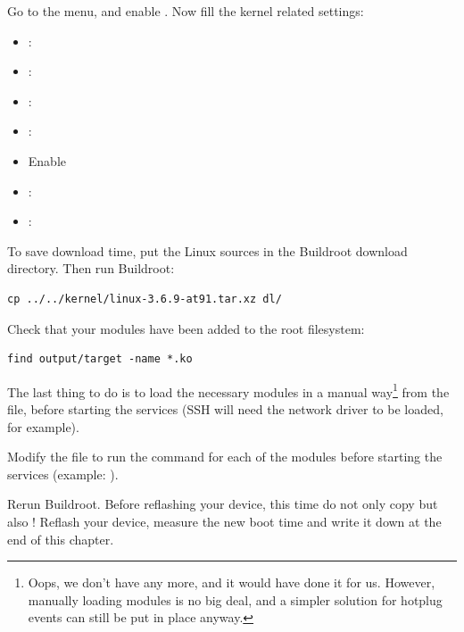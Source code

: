 Go to the  menu, and enable . Now fill
the kernel related settings:

\begin{itemize}
\item {}: 
\item {}:
\item {}: 
\item {}:
\item Enable 
\item {}: 
\item {}: 
\end{itemize}

To save download time, put the Linux sources in the Buildroot download
directory. Then run Buildroot:

\begin{verbatim}
cp ../../kernel/linux-3.6.9-at91.tar.xz dl/
\end{verbatim}

Check that your modules have been added to the root filesystem:

\begin{verbatim}
find output/target -name *.ko
\end{verbatim}

The last thing to do is to load the necessary modules in a manual
way\footnote{Oops, we don't have  any more, and it would have
done it for us. However, manually loading modules is no big deal, and a
simpler solution for hotplug events can still be put in place anyway.}
from the  file, before starting the services (SSH
will need the network driver to be loaded, for example).

Modify the  file to run the
 command for each of the modules before starting the
services (example: ).

Rerun Buildroot. Before reflashing your device, this time do not only
copy  but also
! Reflash your device, measure the new boot time
and write it down at the end of this chapter.

